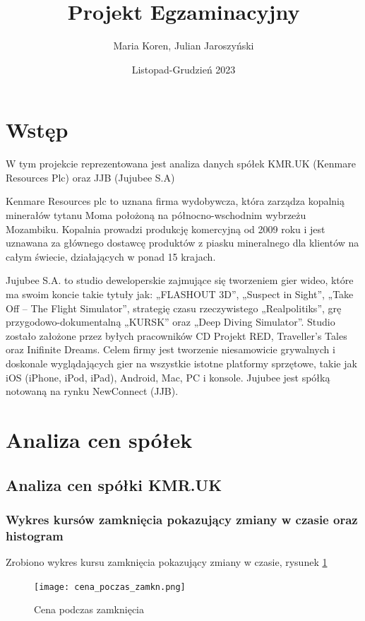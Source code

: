 \documentclass[a4paper,11pt]{article}
\title{Projekt Egzaminacyjny}
\author{Maria Koren, Julian Jaroszyński}
\date{Listopad-Grudzień 2023}
\begin{document}
\maketitle
\newpage
\tableofcontents{}
\newpage

\section{Wstęp}
W tym projekcie reprezentowana jest analiza danych spółek KMR.UK (Kenmare Resources Plc) oraz JJB (Jujubee S.A)

Kenmare Resources plc to uznana firma wydobywcza, która zarządza kopalnią minerałów tytanu Moma położoną na północno-wschodnim wybrzeżu Mozambiku.
Kopalnia prowadzi produkcję komercyjną od 2009 roku i jest uznawana za głównego dostawcę produktów z piasku mineralnego dla klientów na całym świecie, działających w ponad
15 krajach.

Jujubee S.A. to studio deweloperskie zajmujące
się tworzeniem gier wideo, które ma swoim koncie
takie tytuły jak: „FLASHOUT 3D”, „Suspect in
Sight”, „Take Off – The Flight Simulator”,
strategię czasu rzeczywistego „Realpolitiks”, grę
przygodowo-dokumentalną „KURSK” oraz „Deep Diving
Simulator”. Studio zostało założone przez byłych
pracowników CD Projekt RED, Traveller’s Tales oraz
Inifinite Dreams. Celem firmy jest tworzenie niesamowicie
grywalnych i doskonale wyglądających gier na wszystkie
istotne platformy sprzętowe, takie jak iOS (iPhone,
iPod, iPad), Android, Mac, PC i konsole. Jujubee jest
spółką notowaną na rynku NewConnect (JJB).


\section{Analiza cen spółek}
\subsection{Analiza cen spółki KMR.UK}
\subsubsection{Wykres kursów zamknięcia pokazujący zmiany w czasie oraz
histogram}

Zrobiono wykres  kursu zamknięcia pokazujący zmiany w czasie, rysunek \ref{fig:cena_podcaz_zamkn}

\begin{figure}[h]
  \centering
  \texttt{[image: cena\_poczas\_zamkn.png]}
  \caption{Cena podczas zamknięcia}
  \label{fig:cena_podcaz_zamkn}
\end{figure}
\end{document}
